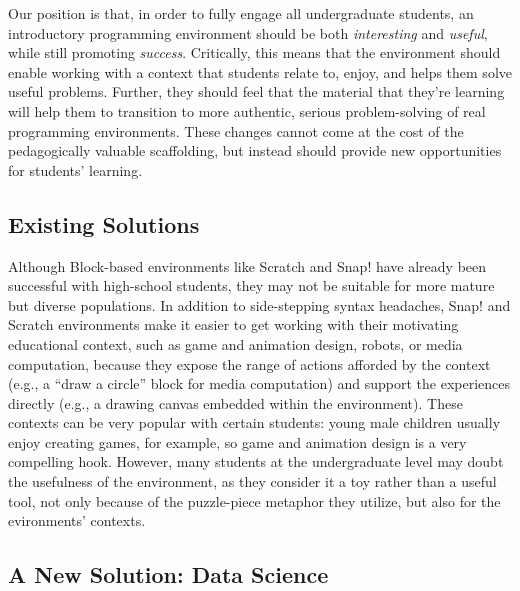 \documentclass[conference]{IEEEtran}
\begin{document}
Our position is that, in order to fully engage all undergraduate students, an introductory programming environment should be both \textit{interesting} and \textit{useful}, while still promoting \textit{success}.
Critically, this means that the environment should enable working with a context that students relate to, enjoy, and helps them solve useful problems.
Further, they should feel that the material that they're learning will help them to transition to more authentic, serious problem-solving of real programming environments.
These changes cannot come at the cost of the pedagogically valuable scaffolding, but instead should provide new opportunities for students' learning.

\subsection{Existing Solutions}

Although Block-based environments like Scratch and Snap! have already been successful with high-school students, they may not be suitable for more mature but diverse populations.
In addition to side-stepping syntax headaches, Snap! and Scratch environments make it easier to get working with their motivating educational context, such as game and animation design, robots, or media computation, because they expose the range of actions afforded by the context (e.g., a ``draw a circle'' block for media computation) and support the experiences directly (e.g., a drawing canvas embedded within the environment).
These contexts can be very popular with certain students: young male children usually enjoy creating games, for example, so game and animation design is a very compelling hook.
However, many students at the undergraduate level may doubt the usefulness of the environment, as they consider it a toy rather than a useful tool, not only because of the puzzle-piece metaphor they utilize, but also for the evironments' contexts.

\subsection{A New Solution: Data Science}
\end{document}
